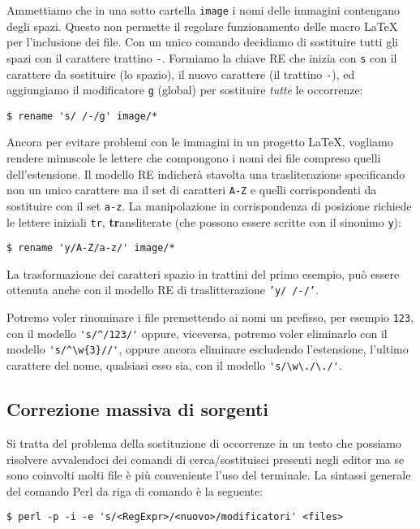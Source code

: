 Ammettiamo che in una sotto cartella \texttt{image} i nomi delle immagini
contengano degli spazi. Questo non permette il regolare funzionamento delle
macro \LaTeX{} per l'inclusione dei file. Con un unico comando decidiamo di
sostituire tutti gli spazi con il carattere trattino \texttt{-}. Formiamo la
chiave RE che inizia con \texttt{s} con il carattere da sostituire (lo spazio),
il nuovo carattere (il trattino \texttt{-}), ed aggiungiamo il modificatore
\texttt{g} (global) per sostituire \emph{tutte} le occorrenze:
\begin{verbatim}
$ rename 's/ /-/g' image/*
\end{verbatim}

Ancora per evitare problemi con le immagini in un progetto \LaTeX, vogliamo
rendere minuscole le lettere che compongono i nomi dei file compreso quelli
dell'estensione. Il modello RE indicherà stavolta una trasliterazione
specificando non un unico carattere ma il set di caratteri \texttt{A-Z} e quelli
corrispondenti da sostituire con il set \texttt{a-z}. La manipolazione in
corrispondenza di posizione richiede le lettere iniziali \texttt{tr},
\textbf{tr}ansliterate (che possono essere scritte con il sinonimo \texttt{y}):
\begin{verbatim}
$ rename 'y/A-Z/a-z/' image/*
\end{verbatim}

La trasformazione dei caratteri spazio in trattini del primo esempio, può essere
ottenuta anche con il modello RE di traslitterazione \texttt{'y/ /-/'}.

Potremo voler rinominare i file premettendo ai nomi un prefisso, per esempio
\texttt{123}, con il modello \verb='s/^/123/'= oppure, viceversa, potremo voler
eliminarlo con il modello \verb='s/^\w{3}//'=, oppure ancora eliminare
escludendo l'estensione, l'ultimo carattere del nome, qualsiasi esso sia, con il
modello \verb='s/\w\./\./'=.


\subsection{Correzione massiva di sorgenti}

Si tratta del problema della sostituzione di occorrenze in un testo che possiamo
risolvere avvalendoci dei comandi di cerca/sostituisci presenti negli editor ma
se sono coinvolti molti file è più conveniente l'uso del terminale. La sintassi
generale del comando Perl da riga di comando è la seguente:
\begin{verbatim}
$ perl -p -i -e 's/<RegExpr>/<nuovo>/modificatori' <files>
\end{verbatim}

